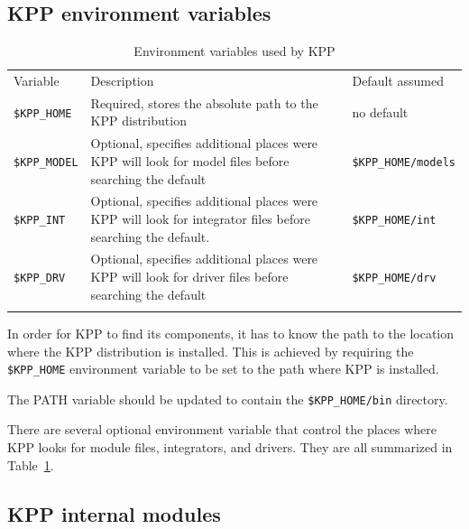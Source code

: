 \documentclass[twoside]{article}
\newcommand{\hhline}{\noalign{\vspace{1mm}}\hline\noalign{\vspace{1mm}}}
\begin{document}
\subsection{KPP environment variables}

\begin{table}
\begin{center}
\caption{Environment variables used by KPP}
\label{tab:environment}
\begin{tabular}{lp{10cm}l}
\hhline
Variable & Description & Default assumed\\
\hhline
\verb|$KPP_HOME| & Required, stores the absolute path to the KPP distribution &
no default\\
\verb|$KPP_MODEL| & Optional, specifies additional places
were KPP will look for model files before searching the default &
\verb|$KPP_HOME/models|\\
\verb|$KPP_INT| & Optional, specifies additional places were KPP will
look for integrator files before searching the default. &
\verb|$KPP_HOME/int|\\
\verb|$KPP_DRV| & Optional, specifies additional places were KPP will
look for driver files before searching the default &
\verb|$KPP_HOME/drv|\\
\hhline
\end{tabular}
\end{center}
\end{table}

In order for KPP to find its components, it has to know the path to the
location where the KPP distribution is installed. This is achieved by
requiring the \verb|$KPP_HOME| environment variable to be set to the path
where KPP is installed.

The PATH variable should be updated to contain the \verb|$KPP_HOME/bin|
directory.

There are several optional environment variable that control the places
where KPP looks for module files, integrators, and drivers. They are all
summarized in Table~\ref{tab:environment}.

\subsection{KPP internal modules}
\end{document}
